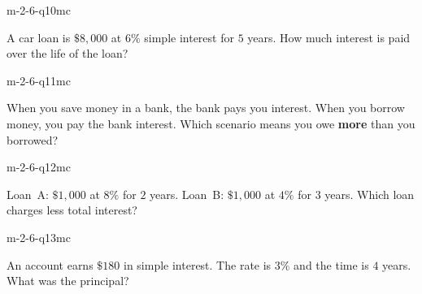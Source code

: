 \begin{practiceQuestion}{m-2-6-q10}{mc}
\begin{questionText}
A car loan is $\$8{,}000$ at $6\%$ simple interest for $5$ years. How much interest is paid over the life of the loan?
\end{questionText}
\end{practiceQuestion}

\begin{practiceQuestion}{m-2-6-q11}{mc}
\begin{questionText}
When you save money in a bank, the bank pays you interest. When you borrow money, you pay the bank interest. Which scenario means you owe \textbf{more} than you borrowed?
\end{questionText}
\end{practiceQuestion}

\begin{practiceQuestion}{m-2-6-q12}{mc}
\begin{questionText}
Loan~A: $\$1{,}000$ at $8\%$ for $2$ years. Loan~B: $\$1{,}000$ at $4\%$ for $3$ years. Which loan charges less total interest?
\end{questionText}
\end{practiceQuestion}

\begin{practiceQuestion}{m-2-6-q13}{mc}
\begin{questionText}
An account earns $\$180$ in simple interest. The rate is $3\%$ and the time is $4$ years. What was the principal?
\end{questionText}
\end{practiceQuestion}

